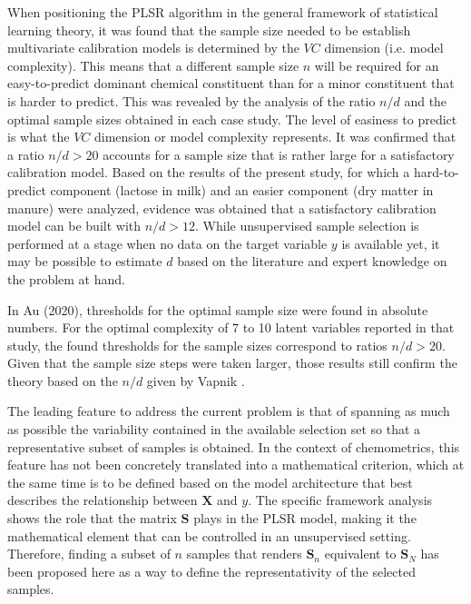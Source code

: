\documentclass[journal=ancham,manuscript=article]{achemso}
\begin{document}
When positioning the PLSR algorithm in the general framework of statistical learning theory, it was found that the sample size needed to be establish multivariate calibration models is determined by the $VC$ dimension (i.e. model complexity). This means that a different sample size $n$ will be required for an easy-to-predict dominant chemical constituent than for a minor constituent that is harder to predict. This was revealed by the analysis of the ratio $n/d$ and the optimal sample sizes obtained in each case study. The level of easiness to predict is what the $VC$ dimension or model complexity represents. It was confirmed that a ratio $n/d>20$ accounts for a sample size that is rather large for a satisfactory calibration model. Based on the results of the present study, for which a hard-to-predict component (lactose in milk) and an easier component (dry matter in manure) were analyzed, evidence was obtained that a satisfactory calibration model can be built with $n/d>12$. While unsupervised sample selection is performed at a stage when no data on the target variable $y$ is available yet, it may be possible to estimate $d$ based on the literature and expert knowledge on the problem at hand.

In Au (2020)\cite{Au2020}, thresholds for the optimal sample size were found in absolute numbers. For the optimal complexity of 7 to 10 latent variables reported in that study, the found thresholds for the sample sizes correspond to ratios $n/d > 20$. Given that the sample size steps were taken larger, those results still confirm the theory based on the $n/d$ given by Vapnik \cite{Vapnik2000}.

The leading feature to address the current problem is that of spanning as much as possible the variability contained in the available selection set so that a representative subset of samples is obtained. In the context of chemometrics, this feature has not been concretely translated into a mathematical criterion, which at the same time is to be defined based on the model architecture that best describes the relationship between $\mathbf{X}$ and $y$. The specific framework analysis shows the role that the matrix $\mathbf{S}$ plays in the PLSR model, making it the mathematical element that can be controlled in an unsupervised setting. Therefore, finding a subset of $n$ samples that renders $\mathbf{S}_n$ equivalent to $\mathbf{S}_N$ has been proposed here as a way to define the representativity of the selected samples. 
\end{document}
